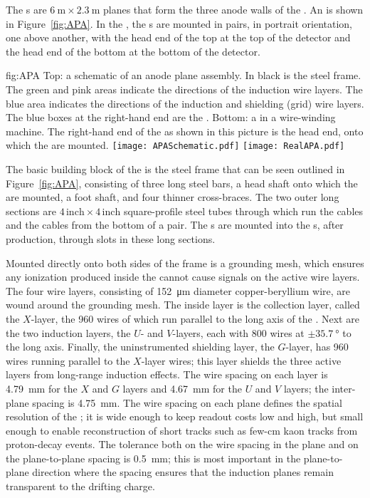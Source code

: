 The s are $\SI{6}{\meter}\times\SI{2.3}{\meter}$ planes that form the three anode walls of the . An  is shown in Figure~\ref{fig:APA}. In the , the s are mounted in pairs, in portrait orientation, one above another, with the head end of the top  at the top of the detector and the head end of the bottom  at the bottom of the detector.

\begin{dunefigure}{fig:APA}
{Top: a schematic of an anode plane assembly. In black is the steel  frame. The green and pink areas indicate the directions of the induction wire layers. The blue area indicates the directions of the induction and shielding (grid) wire layers. The blue boxes at the right-hand end  are the . Bottom: a   in a wire-winding machine. The right-hand end of the  as shown in this picture is the head end, onto which the  are mounted.}
\texttt{[image: APASchematic.pdf]}
\texttt{[image: RealAPA.pdf]}
\end{dunefigure}

The basic building block of the  is the steel frame that can be seen outlined in Figure~\ref{fig:APA}, consisting of three long steel bars, a head shaft onto which the  are mounted, a foot shaft, and four thinner cross-braces. The two outer long sections are $4\,\mathrm{inch}\times 4\,\mathrm{inch}$ square-profile steel tubes through which run the  cables and the  cables from the bottom  of a pair. The s are mounted into the s, after production, through slots in these long sections.

Mounted directly onto both sides of the  frame is a grounding mesh, which ensures any ionization produced inside the  cannot cause signals on the active wire layers. The four wire layers, consisting of \SI{152}{\micro\meter} diameter copper-beryllium wire, are wound around the grounding mesh. The inside layer is the collection layer, called the $X$-layer, the 960 wires of which run parallel to the long axis of the . Next are the two induction layers, the $U$- and $V$-layers, each with 800 wires at $\pm\SI{35.7}{\degree}$ to the long axis. Finally, the uninstrumented shielding layer, the $G$-layer, has 960 wires running parallel to the $X$-layer wires; this layer shields the three active layers from long-range induction effects. The wire spacing on each layer is \SI{4.79}{\mm} for the $X$ and $G$ layers and \SI{4.67}{\mm} for the $U$ and $V$ layers; the inter-plane spacing is \SI{4.75}{\mm}. The wire spacing on each plane defines the spatial resolution of the ; it is wide enough to keep readout costs low and  high, but small enough to enable reconstruction of short tracks such as few-\si{\cm} kaon tracks from proton-decay events. The tolerance both on the wire spacing in the plane and on the plane-to-plane spacing is \SI{0.5}{\mm}; this is most important in the plane-to-plane direction where the spacing ensures that the induction planes remain transparent to the drifting charge.

